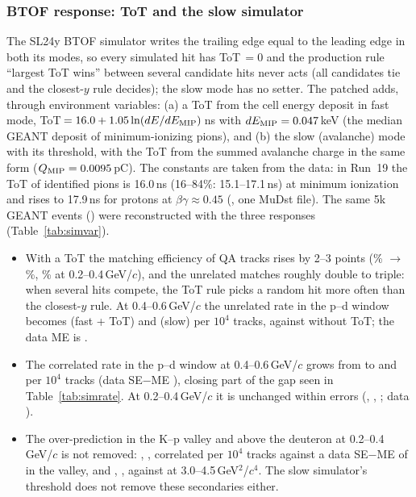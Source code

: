 \subsubsection{BTOF response: ToT and the slow simulator}
\label{sec:simvar}
The SL24y BTOF simulator writes the trailing edge equal to the leading edge in both its modes, so every simulated hit has ToT\,$=0$ and
the production rule ``largest ToT wins'' between several candidate hits never acts (all candidates tie and the closest-$y$ rule
decides); the slow mode has no setter. The patched  adds, through environment variables: (a) a ToT from the cell
energy deposit in fast mode, ToT$\,=16.0+1.05\ln(dE/dE_{\rm MIP})$\,ns with $dE_{\rm MIP}=0.047$\,keV (the median GEANT deposit of
minimum-ionizing pions), and (b) the slow (avalanche) mode with its threshold, with the ToT from the summed avalanche charge in the same
form ($Q_{\rm MIP}=0.0095$\,pC). The constants are taken from the data: in Run~19 the ToT of identified pions is 16.0\,ns (16--84\%:
15.1--17.1\,ns) at minimum ionization and rises to 17.9\,ns for protons at $\beta\gamma\approx0.45$ (, one MuDst
file). The same 5k GEANT events () were reconstructed with the three responses (Table~\ref{tab:simvar}).



\begin{itemize}
\item With a ToT the matching efficiency of QA tracks rises by 2--3 points (\varNoTotEffA\% $\to$ \varTotEffA\%, \varSlowEffA\% at
  0.2--0.4\,GeV/$c$), and the unrelated matches roughly double to triple: when several hits compete, the ToT rule picks a random hit more
  often than the closest-$y$ rule. At 0.4--0.6\,GeV/$c$ the unrelated rate in the p--d window becomes \varTotPdBU{} (fast + ToT) and
  \varSlowPdBU{} (slow) per $10^4$ tracks, against \varNoTotPdBU{} without ToT; the data ME is \varDataPdBU.
\item The correlated rate in the p--d window at 0.4--0.6\,GeV/$c$ grows from \varNoTotPdB{} to \varTotPdB{} and \varSlowPdB{} per $10^4$
  tracks (data SE$-$ME \varDataPdB), closing part of the gap seen in Table~\ref{tab:simrate}. At 0.2--0.4\,GeV/$c$ it is unchanged within
  errors (\varNoTotPdA, \varTotPdA, \varSlowPdA; data \varDataPdA).
\item The over-prediction in the K--p valley and above the deuteron at 0.2--0.4\,GeV/$c$ is not removed: \varNoTotKpA, \varTotKpA, \varSlowKpA{}
  correlated per $10^4$ tracks against a data SE$-$ME of \varDataKpA{} in the valley, and \varNoTotHiA, \varTotHiA, \varSlowHiA{} against
  \varDataHiA{} at 3.0--4.5\,GeV$^2$/$c^4$. The slow simulator's threshold does not remove these secondaries either.
\end{itemize}

